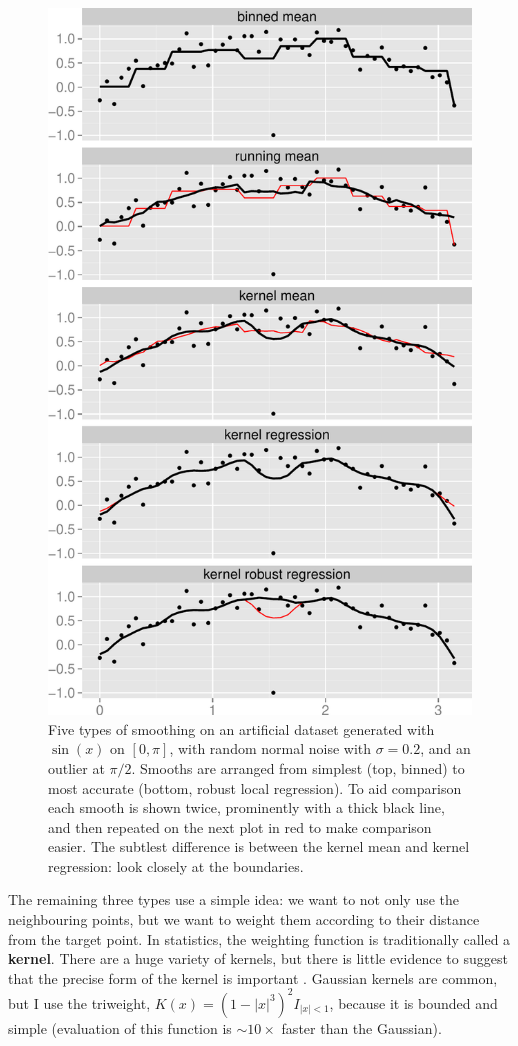 \documentclass[journal]{vgtc}                %
\begin{document}
\begin{figure}[htb]
 \centering
 \includegraphics[width=0.8\linewidth]{smooth-types}
 \caption{Five types of smoothing on an artificial dataset generated with $\sin(x)$ on $[0, \pi]$, with random normal noise with $\sigma = 0.2$, and an outlier at $\pi / 2$. Smooths are arranged from simplest (top, binned) to most accurate (bottom, robust local regression). To aid comparison each smooth is shown twice, prominently with a thick black line, and then repeated on the next plot in red to make comparison easier. The subtlest difference is between the kernel mean and kernel regression: look closely at the boundaries.}
 \label{fig:smooth-types}
\end{figure}

The remaining three types use a simple idea: we want to not only use the neighbouring points, but we want to weight them according to their distance from the target point. In statistics, the weighting function is traditionally called a {\bf kernel}. There are a huge variety of kernels, but there is little evidence to suggest that the precise form of the kernel is important \citep{cleveland:1996}. Gaussian kernels are common, but I use the triweight, $K(x) = (1 - |x|^3)^2 I_{|x| < 1}$, because it is bounded and simple (evaluation of this function is $\sim 10 \times$ faster than the Gaussian).  
\end{document}
